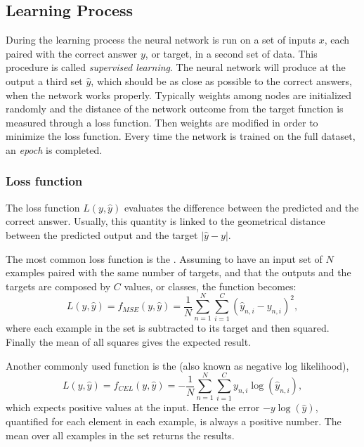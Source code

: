 \subsection{Learning Process}
\label{ssec:Learning_Process}
During the learning process the neural network is run on a set of inputs $x$, each paired with the correct answer $y$, or target, in a second set of data.
This procedure is called \textit{supervised learning}.
The neural network will produce at the output a third set $\hat{y}$, which should be as close as possible to the correct answers, when the network works properly.
Typically weights among nodes are initialized randomly and the distance of the network outcome from the target function is measured through a loss function.
Then weights are modified in order to minimize the loss function.%
Every time the network is trained on the full dataset, an \textit{epoch} is completed.

\subsubsection{Loss function}
\label{sssec:Loss_function}
The loss function $L(y, \hat{y})$ evaluates the difference between the predicted and the correct answer.
Usually, this quantity is linked to the geometrical distance between the predicted output and the target $\left| \hat{y}-y \right|$.

The most common loss function is the .
Assuming to have an input set of $N$ examples paired with the same number of targets, and that the outputs and the targets are composed by $C$ values, or classes, the function becomes:
\begin{equation}
	L(y, \hat{y}) = f_{MSE}(y, \hat{y}) = \frac{1}{N} \sum_{n=1}^N \sum_{i=1}^C \left( \hat{y}_{n,i} - y_{n,i} \right)^2,
\end{equation}
where each example in the set is subtracted to its target and then squared.
Finally the mean of all squares gives the expected result.

Another commonly used function is the  (also known as negative log likelihood),
\begin{equation}
	L(y, \hat{y}) = f_{CEL}(y, \hat{y}) = - \frac{1}{N} \sum_{n=1}^N \sum_{i=1}^C y_{n,i} \log \left( \hat{y}_{n,i} \right),
\end{equation}
which expects positive values at the input.
Hence the error $-y\log \left( \hat{y} \right)$, quantified for each element in each example, is always a positive number.
The mean over all examples in the set returns the results.


